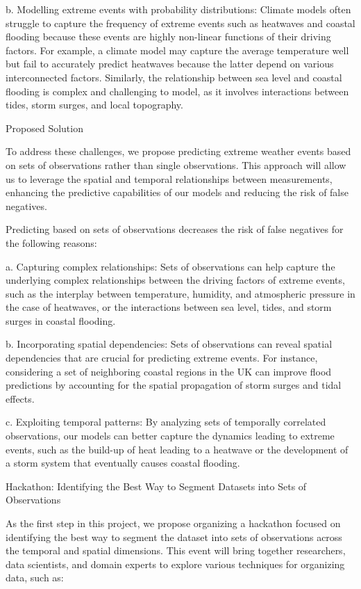 \documentclass[a4paper]{article}
\begin{document}
b. Modelling extreme events with probability distributions: Climate models often struggle to capture the frequency of extreme events such as heatwaves and coastal flooding because these events are highly non-linear functions of their driving factors. For example, a climate model may capture the average temperature well but fail to accurately predict heatwaves because the latter depend on various interconnected factors. Similarly, the relationship between sea level and coastal flooding is complex and challenging to model, as it involves interactions between tides, storm surges, and local topography.

    Proposed Solution

To address these challenges, we propose predicting extreme weather events based on sets of observations rather than single observations. This approach will allow us to leverage the spatial and temporal relationships between measurements, enhancing the predictive capabilities of our models and reducing the risk of false negatives.

Predicting based on sets of observations decreases the risk of false negatives for the following reasons:

a. Capturing complex relationships: Sets of observations can help capture the underlying complex relationships between the driving factors of extreme events, such as the interplay between temperature, humidity, and atmospheric pressure in the case of heatwaves, or the interactions between sea level, tides, and storm surges in coastal flooding.

b. Incorporating spatial dependencies: Sets of observations can reveal spatial dependencies that are crucial for predicting extreme events. For instance, considering a set of neighboring coastal regions in the UK can improve flood predictions by accounting for the spatial propagation of storm surges and tidal effects.

c. Exploiting temporal patterns: By analyzing sets of temporally correlated observations, our models can better capture the dynamics leading to extreme events, such as the build-up of heat leading to a heatwave or the development of a storm system that eventually causes coastal flooding.

    Hackathon: Identifying the Best Way to Segment Datasets into Sets of Observations

As the first step in this project, we propose organizing a hackathon focused on identifying the best way to segment the dataset into sets of observations across the temporal and spatial dimensions. This event will bring together researchers, data scientists, and domain experts to explore various techniques for organizing data, such as:
\end{document}
